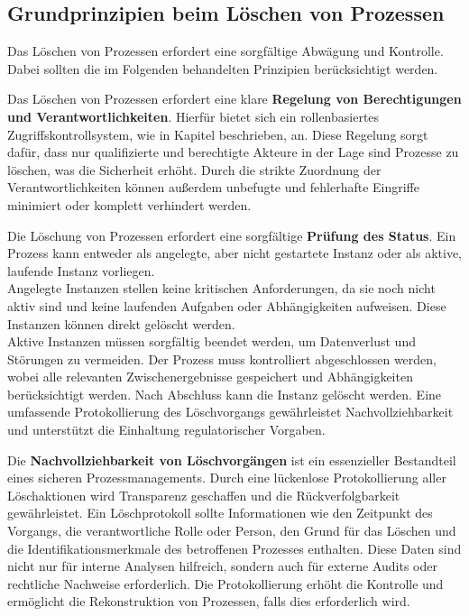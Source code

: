 \subsection*{Grundprinzipien beim Löschen von Prozessen}
Das Löschen von Prozessen erfordert eine sorgfältige Abwägung und Kontrolle. Dabei sollten die im Folgenden behandelten Prinzipien berücksichtigt werden.

Das Löschen von Prozessen erfordert eine klare \textbf{Regelung von Berechtigungen und Verantwortlichkeiten}. Hierfür bietet sich ein rollenbasiertes Zugriffskontrollsystem, wie in Kapitel  beschrieben, an. Diese Regelung sorgt dafür, dass nur qualifizierte und berechtigte Akteure in der Lage sind Prozesse zu löschen, was die Sicherheit erhöht. Durch die strikte Zuordnung der Verantwortlichkeiten können außerdem unbefugte und fehlerhafte Eingriffe minimiert oder komplett verhindert werden. \cite[Vgl.][]{Sandhu1998} \cite[Vgl.][]{ISO27001}

Die Löschung von Prozessen erfordert eine sorgfältige \textbf{Prüfung des Status}. Ein Prozess kann entweder als angelegte, aber nicht gestartete Instanz oder als aktive, laufende Instanz vorliegen.\\
Angelegte Instanzen stellen keine kritischen Anforderungen, da sie noch nicht aktiv sind und keine laufenden Aufgaben oder Abhängigkeiten aufweisen. Diese Instanzen können direkt gelöscht werden.\\
Aktive Instanzen müssen sorgfältig beendet werden, um Datenverlust und Störungen zu vermeiden. Der Prozess muss kontrolliert abgeschlossen werden, wobei alle relevanten Zwischenergebnisse gespeichert und Abhängigkeiten berücksichtigt werden. Nach Abschluss kann die Instanz gelöscht werden. Eine umfassende Protokollierung des Löschvorgangs gewährleistet Nachvollziehbarkeit und unterstützt die Einhaltung regulatorischer Vorgaben.

Die \textbf{Nachvollziehbarkeit von Löschvorgängen} ist ein essenzieller Bestandteil eines sicheren Prozessmanagements. Durch eine lückenlose Protokollierung aller Löschaktionen wird Transparenz geschaffen und die Rückverfolgbarkeit gewährleistet. Ein Löschprotokoll sollte Informationen wie den Zeitpunkt des Vorgangs, die verantwortliche Rolle oder Person, den Grund für das Löschen und die Identifikationsmerkmale des betroffenen Prozesses enthalten. Diese Daten sind nicht nur für interne Analysen hilfreich, sondern auch für externe Audits oder rechtliche Nachweise erforderlich. Die Protokollierung erhöht die Kontrolle und ermöglicht die Rekonstruktion von Prozessen, falls dies erforderlich wird.

